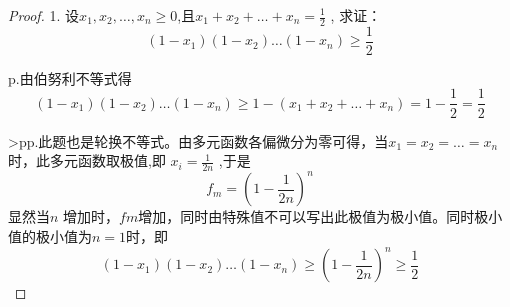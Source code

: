  \begin{proof}
    1. 设$x_1,x_2,\dots,x_n\geqslant 0$,且$x_1+x_2+\dots+x_n=\frac{1}{2}$ , 求证：
    \[
       (1-x_1)(1-x_2)\dots(1-x_n)\geqslant \frac{1}{2}
    \]

    p.由伯努利不等式得
    \[
       (1-x_1)(1-x_2)\dots(1-x_n)
       \geqslant
       1-(x_1+x_2+\dots+x_n)
       =1-\frac{1}{2}=\frac{1}{2}
    \]

   >pp.此题也是轮换不等式。由多元函数各偏微分为零可得，当$x_1=x_2=\dots=x_n$时，此多元函数取极值,即
    $x_i=\frac{1}{2n}$ ,于是
    \[
       f_m= (1-\frac{1}{2n})^n
    \]
    显然当$n$ 增加时，$fm$增加，同时由特殊值不可以写出此极值为极小值。同时极小值的极小值为$n=1$时，即 
    \[
       (1-x_1)(1-x_2)\dots(1-x_n)
       \geqslant
       (1-\frac{1}{2n})^n
       \geqslant
       \frac{1}{2}
    \]

 \end{proof}
